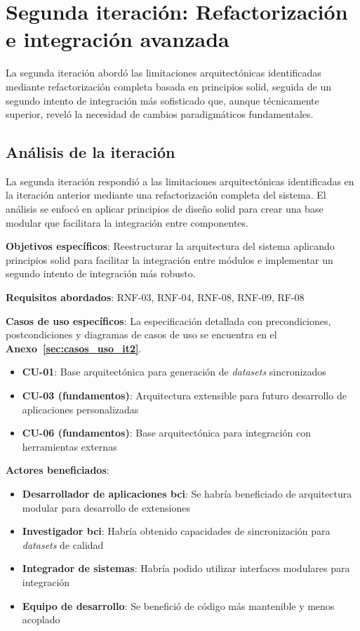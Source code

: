 \section{Segunda iteración: Refactorización e integración avanzada}
\label{sec:iteracion_2}

La segunda iteración abordó las limitaciones arquitectónicas identificadas mediante refactorización completa basada en principios \acrshort{solid}, seguida de un segundo intento de integración más sofisticado que, aunque técnicamente superior, reveló la necesidad de cambios paradigmáticos fundamentales.

\subsection{Análisis de la iteración}
\label{subsec:analisis_iteracion_2}

La segunda iteración respondió a las limitaciones arquitectónicas identificadas en la iteración anterior mediante una refactorización completa del sistema. El análisis se enfocó en aplicar principios de diseño \acrshort{solid} para crear una base modular que facilitara la integración entre componentes.

\textbf{Objetivos específicos}: Reestructurar la arquitectura del sistema aplicando principios \acrshort{solid} para facilitar la integración entre módulos e implementar un segundo intento de integración más robusto.

\textbf{Requisitos abordados}: RNF-03, RNF-04, RNF-08, RNF-09, RF-08

\textbf{Casos de uso específicos}: La especificación detallada con precondiciones, postcondiciones y diagramas de casos de uso se encuentra en el \textbf{Anexo~\ref{sec:casos_uso_it2}}.
\begin{itemize}
    \item \textbf{CU-01}: Base arquitectónica para generación de \textit{\glspl{dataset}} sincronizados
    \item \textbf{CU-03 (fundamentos)}: Arquitectura extensible para futuro desarrollo de aplicaciones personalizadas
    \item \textbf{CU-06 (fundamentos)}: Base arquitectónica para integración con herramientas externas
\end{itemize}

\textbf{Actores beneficiados}:
\begin{itemize}
    \item \textbf{Desarrollador de aplicaciones \acrshort{bci}}: Se habría beneficiado de arquitectura modular para desarrollo de extensiones
    \item \textbf{Investigador \acrshort{bci}}: Habría obtenido capacidades de sincronización para \textit{\glspl{dataset}} de calidad
    \item \textbf{Integrador de sistemas}: Habría podido utilizar interfaces modulares para integración
    \item \textbf{Equipo de desarrollo}: Se benefició de código más mantenible y menos acoplado
\end{itemize}


